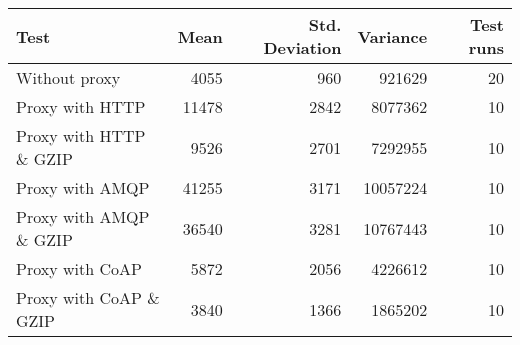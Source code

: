 \begin{tabular}{lrrrr}
\hline
 Test                   &   Mean &   Std. Deviation &   Variance &   Test runs \\
\hline
 Without proxy          &   4055 &              960 &     921629 &          20 \\
 Proxy with HTTP        &  11478 &             2842 &    8077362 &          10 \\
 Proxy with HTTP \& GZIP &   9526 &             2701 &    7292955 &          10 \\
 Proxy with AMQP        &  41255 &             3171 &   10057224 &          10 \\
 Proxy with AMQP \& GZIP &  36540 &             3281 &   10767443 &          10 \\
 Proxy with CoAP        &   5872 &             2056 &    4226612 &          10 \\
 Proxy with CoAP \& GZIP &   3840 &             1366 &    1865202 &          10 \\
\hline
\end{tabular}